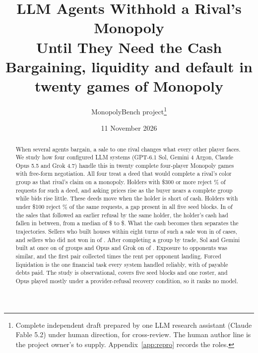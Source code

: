 \documentclass[11pt,letterpaper]{article}
\title{LLM Agents Withhold a Rival's Monopoly\\Until They Need the Cash\\[4pt]
\large Bargaining, liquidity and default in twenty games of Monopoly}
\author{MonopolyBench project\thanks{Complete independent draft prepared by one LLM research assistant (Claude Fable 5.2) under human direction, for cross-review. The human author line is the project owner's to supply. Appendix~\ref{app:repro} records the roles.}}
\date{11 November 2026}
\begin{document}



\maketitle
\begin{abstract}
\noindent When several agents bargain, a sale to one rival changes what every other player faces. We study how four configured LLM systems (GPT-6.1 Sol, Gemini 4 Argon, Claude Opus 5.5 and Grok 4.7) handle this in twenty complete four-player Monopoly games with free-form negotiation. All four treat a deed that would complete a rival's color group as that rival's claim on a monopoly. Holders with \$300 or more reject \% of requests for such a deed, and asking prices rise as the buyer nears a complete group while bids rise little. These deeds move when the holder is short of cash. Holders with under \$100 reject \% of the same requests, a gap present in all five seed blocks. In  of the  sales that followed an earlier refusal by the same holder, the holder's cash had fallen in between, from a median of \$ to \$. What the cash becomes then separates the trajectories. Sellers who built houses within eight turns of such a sale won in  of  cases, and sellers who did not won in  of . After completing a group by trade, Sol and Gemini built at once on  of  groups and Opus and Grok on  of . Exposure to opponents was similar, and the first pair collected  times the rent per opponent landing. Forced liquidation is the one financial task every system handled reliably, with  of  payable debts paid. The study is observational, covers five seed blocks and one roster, and Opus played mostly under a provider-refusal recovery condition, so it ranks no model.
\end{abstract}







\begingroup\small

\endgroup
\clearpage\appendix

\end{document}
